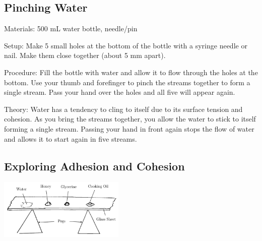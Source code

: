 \begin{multicols}{2}
\subsection{Pinching Water}
\begin{description*}
\item[Materials:]{500 mL water bottle, needle/pin}
\item[Setup:]{Make 5 small holes at the bottom of the bottle with a syringe needle or nail. Make them close together (about 5 mm apart).}
\item[Procedure:]{Fill the bottle with water and allow it to flow through the holes at the bottom. Use your thumb and forefinger to pinch the streams together to form a single stream. Pass your hand over the holes and all five will appear again.}
\item[Theory:]{Water has a tendency to cling to itself due to its surface tension and cohesion. As you bring the streams together, you allow the water to stick to itself forming a single stream. Passing your hand in front again stops the flow of water and allows it to start again in five streams.}
\end{description*}

\columnbreak

\subsection{Exploring Adhesion and Cohesion}

\begin{center}
\includegraphics[width=0.45\textwidth]{./img/adhesion-cohesion.png}
\end{center}


\end{multicols}
